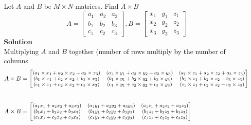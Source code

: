 \documentclass[12pt]{report}
\begin{document}
	Let $A$ and $B$ be $M \times N$ matrices. Find $A\times B$
	$$A= \begin{bmatrix}
		a_{1} & a_{2} & a_{3}\\
		b_{1} & b_{2} & b_{3}\\
		c_{1} & c_{2} & c_{3}
	\end{bmatrix}, B = \begin{bmatrix}
		x_{1} & y_{1} & z_1\\
		x_{2} & y_{2} & z_2\\
		x_{3} & y_{3} & z_3
	\end{bmatrix} 
	$$
	\textbf{Solution}\\
	Multiplying $A$ and $B$ together (number of rows multiply by the number of columns
	\begin{align*}
		A \times B &= \footnotesize\begin{bmatrix}
			(a_{1}\times x_{1} + a_{2} \times x_{2} + a_{3} \times x_{3})  & (a_{1} \times y_{1}+a_{2}\times y_{2} + a_{3}\times y_{3})  & (a_{1} \times z_{1}+a_{2}\times z_{2} + a_{3}\times z_{3})\\
			(b_{1}\times x_{1} + b_{2} \times x_{2} + b_{3} \times x_{3})  & (b_{1} \times y_{1}+b_{2}\times y_{2} + b_{3}\times y_{3}) & (b_{1} \times z_{1}+b_{2}\times z_{2} + b_{3}\times z_{3})\\
			(c_{1}\times x_{1} + c_{2} \times x_{2} + c_{3} \times x_{3})  & (c_{1} \times y_{1}+c_{2}\times y_{2} + c_{3}\times y_{3}) & (c_{1} \times z_{1}+c_{2}\times z_{2} + c_{3}\times z_{3})
		\end{bmatrix}\\[0.7cm]
		A\times B &= \footnotesize\begin{bmatrix}(a_{1} x_{1} + a_{2}  x_{2} + a_{3}  x_{3})  & (a_{1}  y_{1}+a_{2} y_{2} + a_{3} y_{3}) &  (a_{1}  z_{1}+a_{2} z_{2} + a_{3} z_{3})\\
			(b_{1} x_{1} + b_{2}  x_{2} + b_{3}  x_{3})  & (b_{1}  y_{1}+b_{2} y_{2} + b_{3} y_{3}) & (b_{1}  z_{1}+b_{2} z_{2} + b_{3} z_{3})\\
			(c_{1} x_{1} + c_{2}  x_{2} + c_{3}  x_{3})  & (c_{1}  y_{1}+c_{2} y_{2} + c_{3} y_{3}) &  (c_{1}  z_{1}+c_{2} z_{2} + c_{3} z_{3})
		\end{bmatrix}
	\end{align*}
	
\end{document}
